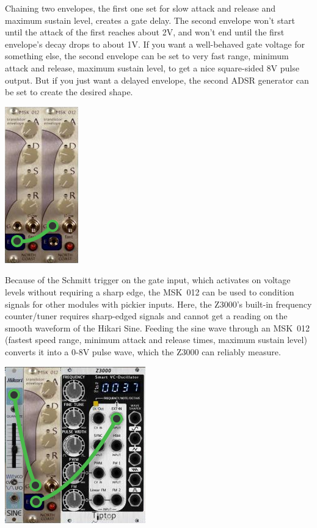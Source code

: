 Chaining two envelopes, the first one set for slow attack and release and
maximum sustain level, creates a gate delay.  The second envelope won't
start until the attack of the first reaches about 2V, and won't end until
the first envelope's decay drops to about 1V.  If you want a well-behaved
gate voltage for something else, the second envelope can be set to very fast
range, minimum attack and release, maximum sustain level, to get a nice
square-sided 8V pulse output.  But if you just want a delayed envelope, the
second ADSR generator can be set to create the desired shape.

\nopagebreak\noindent
{\hspace*{\fill}\includegraphics[scale=0.78]{patch4.png}\hspace*{\fill}\par} 

\pagebreak

Because of the Schmitt trigger on the gate input, which activates on voltage
levels without requiring a sharp edge, the MSK~012 can be used to condition
signals for other modules with pickier inputs.  Here, the Z3000's built-in
frequency counter/tuner requires sharp-edged signals and cannot get a
reading on the smooth waveform of the Hikari Sine.  Feeding the sine wave
through an MSK~012 (fastest speed range, minimum attack and release times,
maximum sustain level) converts it into a 0-8V pulse wave, which the Z3000
can reliably measure.

\nopagebreak\noindent
{\hspace*{\fill}\includegraphics[scale=0.78]{patch5.png}\hspace*{\fill}\par} 
